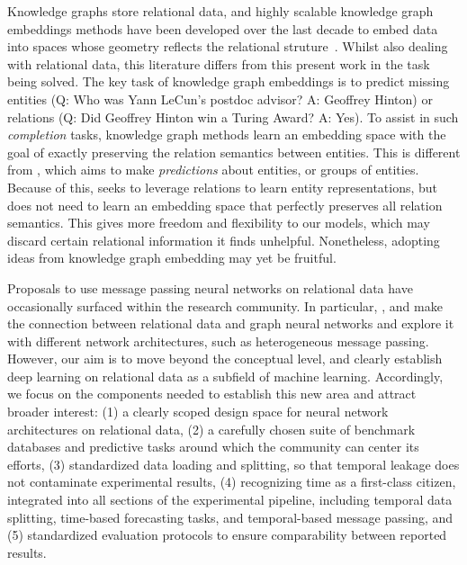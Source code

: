   Knowledge graphs store relational data, and highly scalable knowledge graph embeddings methods have been developed over the last decade to embed data into spaces whose geometry reflects the relational struture~\citep{bordes2013translating,wang2014knowledge,wang2017knowledge}. Whilst also dealing with relational data, this literature differs from this present work in the task being solved. The key task of knowledge graph embeddings is to predict missing entities (Q: Who was Yann LeCun's postdoc advisor? A: Geoffrey Hinton)  or relations  (Q: Did Geoffrey Hinton win a Turing Award? A: Yes). To assist in such \emph{completion} tasks, knowledge graph methods learn an embedding space with the goal of exactly preserving the relation semantics between entities. This is different from \AreaName, which aims to make \emph{predictions} about entities, or groups of entities. Because of this, \AreaName seeks to leverage relations to learn entity representations, but does not need to learn an embedding space that perfectly preserves all relation semantics. This gives more freedom and flexibility to our models, which may discard certain relational information it finds unhelpful. Nonetheless, adopting ideas from knowledge graph embedding may yet be fruitful.
 
 Proposals to use message passing neural networks on relational data have occasionally surfaced within the research community. In particular, \cite{schlichtkrull2018relational, cvitkovic2020supervisedrd, vsir2021deep}, and \cite{zahradnik2023deep} make the connection between relational data and graph neural networks and explore it with different network architectures, such as heterogeneous message passing. However, our aim is to move beyond the conceptual level, and clearly establish deep learning on relational data as a subfield of machine learning. Accordingly, we focus on the components needed to establish this new area and attract broader interest: (1) a clearly scoped design space for neural network architectures on relational data, (2) a carefully chosen suite of benchmark databases and predictive tasks around which the community can center its efforts, (3) standardized data loading and splitting, so that temporal leakage does not contaminate experimental results, (4) recognizing time as a first-class citizen, integrated into all sections of the experimental pipeline, including temporal data splitting, time-based forecasting tasks, and temporal-based message passing, and (5) standardized evaluation protocols to ensure comparability between reported results.


